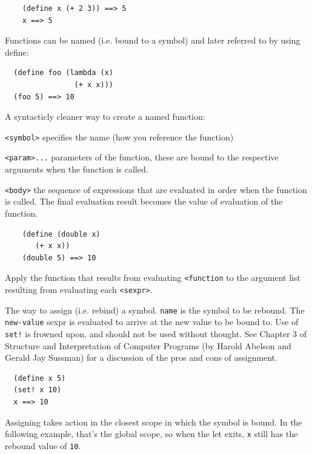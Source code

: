 \documentclass[12pt]{article}
\begin{document}
\begin{verbatim}
    (define x (+ 2 3)) ==> 5
    x ==> 5
\end{verbatim}

Functions can be named (i.e. bound to a symbol) and later referred to
by using define:

\begin{verbatim}
  (define foo (lambda (x) 
                (+ x x)))
  (foo 5) ==> 10  
\end{verbatim}



A syntacticly cleaner way to create a named function:

\verb|<symbol>| specifies the name (how you reference the function)

\verb|<param>...| parameters of the function, these are bound to the
respective arguments when the function is called. 

\verb|<body>| the sequence of expressions that are evaluated in order
when the function is called. The final evaluation result becomes the
value of evaluation of the function. 

\begin{verbatim}
    (define (double x)
       (+ x x))
    (double 5) ==> 10
\end{verbatim}


Apply the function that results from evaluating \verb|<function| to
the argument list resulting from evaluating each \verb|<sexpr>|.


The way to assign (i.e. rebind) a symbol. \verb|name| is the symbol to be rebound. The \verb|new-value| sexpr is
evaluated to arrive at the new value to be bound to. Use of
\verb|set!| is frowned upon, and should not be used without thought.
See Chapter 3 of Structure and Interpretation of Computer Programs (by
Harold Abelson and Gerald Jay Sussman) for a discussion of the pros
and cons of assignment.

\begin{verbatim}
  (define x 5)
  (set! x 10)
  x ==> 10
\end{verbatim}

Assigning takes action in the closest scope in which the symbol is
bound. In the following example, that's the global scope, so when the
let exits, \verb|x| still has the rebound value of \verb|10|.
\end{document}
